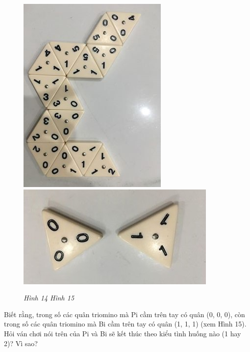 	\begin{figure}[H]
		\centering
		\vspace*{-5pt}
		\captionsetup{labelformat=empty, justification=centering}
		\includegraphics[height=0.3\textwidth,angle=90]{h9}
		\includegraphics[height=0.225\textwidth]{h10}
		\caption{\textit{\small Hình 14 \hspace*{75pt} Hình 15}}
		\vspace*{-8pt}
	\end{figure}
	Biết rằng, trong số các quân triomino mà Pi cầm trên tay có quân (0, 0, 0), còn trong số các quân triomino mà Bi cầm trên tay có quân (1, 1, 1) (xem Hình 15).
	\vskip 0.1cm
	Hỏi ván chơi nói trên của Pi và Bi sẽ kết thúc theo kiểu tình huống nào (1 hay 2)? Vì sao?
